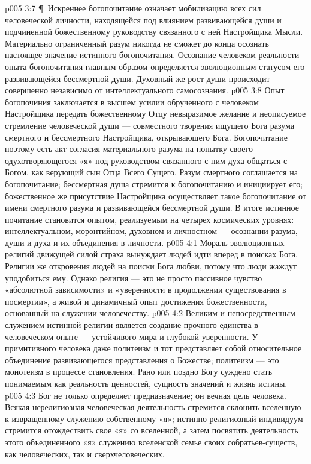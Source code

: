 \vs p005 3:7 \P\ Искреннее богопочитание означает мобилизацию всех сил человеческой личности, находящейся под влиянием развивающейся души и подчиненной божественному руководству связанного с ней Настройщика Мысли. Материально ограниченный разум никогда не сможет до конца осознать настоящее значение истинного богопочитания. Осознание человеком реальности опыта богопочитания главным образом определяется эволюционным статусом его развивающейся бессмертной души. Духовный же рост души происходит совершенно независимо от интеллектуального самосознания.
\vs p005 3:8 Опыт богопочиния заключается в высшем усилии обрученного с человеком Настройщика передать божественному Отцу невыразимое желание и неописуемое стремление человеческой души --- совместного творения ищущего Бога разума смертного и бессмертного Настройщика, открывающего Бога. Богопочитание поэтому есть акт согласия материального разума на попытку своего одухотворяющегося «я» под руководством связанного с ним духа общаться с Богом, как верующий сын Отца Всего Сущего. Разум смертного соглашается на богопочитание; бессмертная душа стремится к богопочитанию и инициирует его; божественное же присутствие Настройщика осуществляет такое богопочитание от имени смертного разума и развивающейся бессмертной души. В итоге истинное почитание становится опытом, реализуемым на четырех космических уровнях: интеллектуальном, моронтийном, духовном и личностном --- осознании разума, души и духа и их объединения в личности.
\vs p005 4:1 Мораль эволюционных религий движущей силой страха вынуждает людей идти вперед в поисках Бога. Религии же откровения  людей на поиски Бога любви, потому что люди жаждут уподобиться ему. Однако религия --- это не просто пассивное чувство «абсолютной зависимости» и «уверенности в продолжении существования в посмертии», а живой и динамичный опыт достижения божественности, основанный на служении человечеству.
\vs p005 4:2 Великим и непосредственным служением истинной религии является создание прочного единства в человеческом опыте --- устойчивого мира и глубокой уверенности. У примитивного человека даже политеизм и тот представляет собой относительное объединение развивающегося представления о Божестве; политеизм --- это монотеизм в процессе становления. Рано или поздно Богу суждено стать понимаемым как реальность ценностей, сущность значений и жизнь истины.
\vs p005 4:3 Бог не только определяет предназначение; он  вечная цель человека. Всякая нерелигиозная человеческая деятельность стремится склонить вселенную к извращенному служению собственному «я»; истинно религиозный индивидуум стремится отождествить свое «я» со вселенной, а затем посвятить деятельность этого объединенного «я» служению вселенской семье своих собратьев\hyp{}существ, как человеческих, так и сверхчеловеческих.
